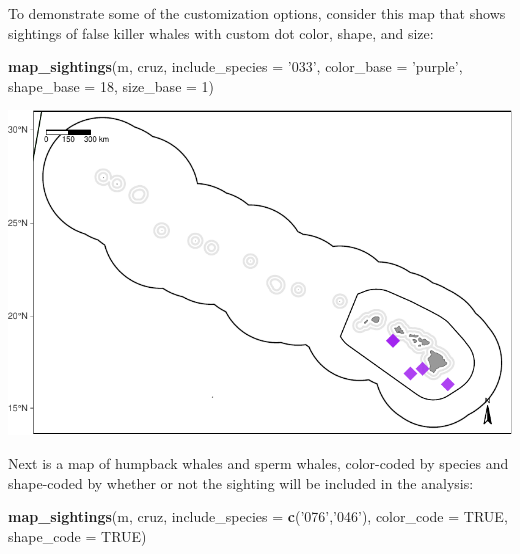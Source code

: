 \documentclass[
]{book}
\newenvironment{Shaded}{\begin{snugshade}}{\end{snugshade}}
\newcommand{\DataTypeTok}[1]{\textcolor[rgb]{0.13,0.29,0.53}{#1}}
\newcommand{\DecValTok}[1]{\textcolor[rgb]{0.00,0.00,0.81}{#1}}
\newcommand{\KeywordTok}[1]{\textcolor[rgb]{0.13,0.29,0.53}{\textbf{#1}}}
\newcommand{\NormalTok}[1]{#1}
\newcommand{\OtherTok}[1]{\textcolor[rgb]{0.56,0.35,0.01}{#1}}
\newcommand{\StringTok}[1]{\textcolor[rgb]{0.31,0.60,0.02}{#1}}
\begin{document}
To demonstrate some of the customization options, consider this map that shows sightings of false killer whales with custom dot color, shape, and size:

\begin{Shaded}
\begin{Highlighting}[]
\KeywordTok{map_sightings}\NormalTok{(m,}
\NormalTok{              cruz,}
              \DataTypeTok{include_species =} \StringTok{'033'}\NormalTok{,}
              \DataTypeTok{color_base =} \StringTok{'purple'}\NormalTok{,}
              \DataTypeTok{shape_base =} \DecValTok{18}\NormalTok{,}
              \DataTypeTok{size_base =} \DecValTok{1}\NormalTok{)}
\end{Highlighting}
\end{Shaded}

\includegraphics{figures/unnamed-chunk-62-1.pdf}

Next is a map of humpback whales and sperm whales, color-coded by species and shape-coded by whether or not the sighting will be included in the analysis:

\begin{Shaded}
\begin{Highlighting}[]
\KeywordTok{map_sightings}\NormalTok{(m, }
\NormalTok{              cruz,}
              \DataTypeTok{include_species =} \KeywordTok{c}\NormalTok{(}\StringTok{'076'}\NormalTok{,}\StringTok{'046'}\NormalTok{),}
              \DataTypeTok{color_code =} \OtherTok{TRUE}\NormalTok{,}
              \DataTypeTok{shape_code =} \OtherTok{TRUE}\NormalTok{)}
\end{Highlighting}
\end{Shaded}
\end{document}
